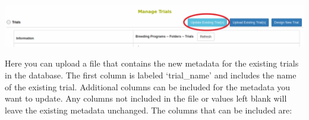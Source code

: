 \documentclass[
  12pt,
]{book}
\begin{document}
\begin{center}\includegraphics[width=0.95\linewidth]{assets/images/update_trial_metadata} \end{center}

Here you can upload a file that contains the new metadata for the existing trials in the database. The first column is labeled `trial\_name' and includes the name of the existing trial. Additional columns can be included for the metadata you want to update. Any columns not included in the file or values left blank will leave the existing metadata unchanged. The columns that can be included are:
\end{document}
